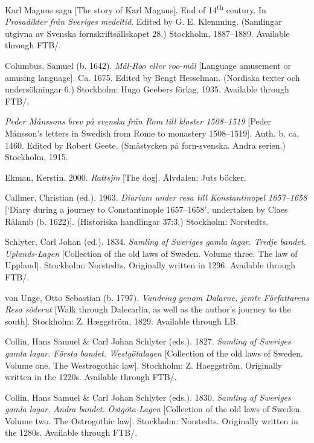 \documentclass[output=paper]{langscibook}
\begin{document}
\begin{description}[font=\normalfont]
\item[KM:] Karl Magnus saga [The story of Karl Magnus]. End of 14\textsuperscript{th} century. In \textit{Prosadikter från Sveriges medeltid}. Edited by G. E. Klemming. (Samlingar utgivna av Svenska fornskriftsällskapet 28.) Stockholm, 1887–1889. Available through FTB\slash {}.
\item[Mål-roo:] Columbus, Samuel (b. 1642). \textit{Mål-Roo eller roo-mål} [Language amusement or amusing language]. Ca. 1675. Edited by Bengt Hesselman. (Nordiska texter och undersökningar 6.) Stockholm: Hugo Geebers förlag, 1935. Available through FTB\slash {}.
\item[Måns:] \textit{Peder Månssons brev på svenska från Rom till  kloster 1508–1519} [Peder Månsson’s letters in Swedish from Rome to  monastery 1508–1519]. Auth. b. ca. 1460. Edited by Robert Geete. (Småstycken på forn-svenska. Andra serien.) Stockholm, 1915.
\item[Rattsjin:] Ekman, Kerstin. 2000. \textit{Rattsjin} [The dog]. Älvdalen: Juts böcker. 
\item[Rålamb:] Callmer, Christian (ed.). 1963. \textit{Diarium under resa till Konstantinopel 1657–1658} [`Diary during a journey to Constantinople 1657–1658’, undertaken by Claes Rålamb (b. 1622)]. (Historiska handlingar 37:3.) Stockholm: Norstedts.
\item[UL:] Schlyter, Carl Johan (ed.). 1834. \emph{Samling af Sweriges gamla lagar. Tredje bandet.} \textit{Uplands-Lagen} [Collection of the old laws of Sweden. Volume three. The law of Uppland]. Stockholm: Norstedts. Originally written in 1296. Available through FTB\slash {}.
\item[von Unge:] von Unge, Otto Sebastian (b. 1797). \textit{Vandring genom Dalarne, jemte Författarens Resa söderut} [Walk through Dalecarlia, as well as the author’s journey to the south]. Stockholm: Z. Hæggström, 1829. Available through LB.
\item[\isi{EWL}:] Collin, Hans Samuel \& Carl Johan Schlyter (eds.). 1827. \emph{Samling af Sweriges gamla lagar. Första bandet. Westgötalagen} [Collection of the old laws of Sweden. Volume one. The Westrogothic law]. Stockholm: Z. Haeggström. Originally written in the 1220s. Available through FTB\slash {}.
\item[ÖgL:] Collin, Hans Samuel \& Carl Johan Schlyter (eds.). 1830. \emph{Samling af Sweriges gamla lagar. Andra bandet.} \textit{Östgöta-Lagen} [Collection of the old laws of Sweden. Volume two. The Ostrogothic law]. Stockholm: Norstedts. Originally written in the 1280s. Available through FTB\slash {}.
\end{description}
\end{document}
